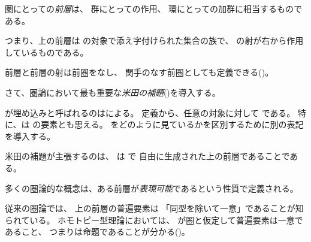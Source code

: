 \documentclass[index]{subfiles}
\begin{document}

圏にとっての\emph{前層}は、
群にとっての作用、
環にとっての加群に相当するものである。




つまり、上の前層は
の対象で添え字付けられた集合の族で、
の射が右から作用しているものである。




前層と前層の射は前圏をなし、
関手のなす前圏としても定義できる()。






さて、圏論において最も重要な\emph{米田の補題}()を導入する。




が埋め込みと呼ばれるのはによる。
定義から、任意の対象に対して
である。
特に、は
の要素とも思える。
をどのように見ているかを区別するために別の表記を導入する。



米田の補題が主張するのは、
は
で
自由に生成された上の前層であることである。




多くの圏論的な概念は、ある前層が\emph{表現可能}であるという性質で定義される。



従来の圏論では、
上の前層の普遍要素は
「同型を除いて一意」であることが知られている。
ホモトピー型理論においては、
が圏と仮定して普遍要素は一意であること、
つまりは命題であることが分かる()。



\end{document}
